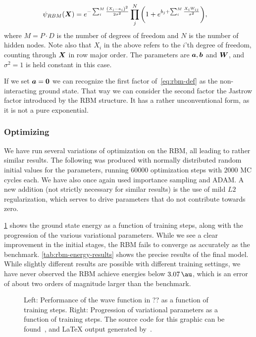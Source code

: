 \documentclass[Thesis.tex]{subfiles}
\begin{document}
\begin{align}
  \label{eq:rbm-def}
  \psi_{RBM}(\bm{X}) &=
        e^{-\sum_i^{M} \frac{\qty(X_i-a_i)^2}{2\sigma^2}}
        \prod_j^N \qty(1 + e^{b_j+\sum_i^M \frac{X_iW_{ij}}{\sigma^2}}),
\end{align}
where $M = P\cdot D$ is the number of degrees of freedom and $N$ is the number
of hidden nodes. Note also that $X_i$ in the above refers to the $i$'th degree
of freedom, counting through $\bm{X}$ in row major order. The parameters are
$\bm{a}, \bm{b}$ and $\bm{W}$, and $\sigma^2=1$ is held constant in this case.

If we set $\bm{a} = \bm{0}$ we can recognize the first factor of~\cref{eq:rbm-def}
as the non-interacting ground state. That way we can consider the second factor
the Jastrow factor introduced by the RBM structure. It has a rather
unconventional form, as it is not a pure exponential.


\subsubsection{Optimizing}

We have run several variations of optimization on the RBM, all leading to rather
similar results. The following was produced with normally distributed random
initial values for the parameters, running $\num{60000}$ optimization steps with
$\num{2000}$ MC cycles each. We have also once again used importance sampling
and ADAM. A new addition (not strictly necessary for similar results) is the use
of mild $L2$ regularization, which serves to drive parameters that do not
contribute towards zero.

\cref{fig:QD-rbm-training} shows the ground state energy as a function of
training steps, along with the progression of the various variational
parameters. While we see a clear improvement in the initial stages, the RBM
fails to converge as accurately as the benchmark. \cref{tab:rbm-energy-results}
shows the precise results of the final model. While slightly different results
are possible with different training settings, we have never observed the RBM
achieve energies below $\SI{3.07}{\au}$, which is an error of about two orders
of magnitude larger than the benchmark.



\begin{figure}[h]
   \centering
    \resizebox{\linewidth}{!}{%
        
    }
    \caption{\label{fig:QD-rbm-training}Left: Performance of the
      wave function in ?? as a function of
      training steps. Right: Progression of variational parameters as a function
      of training steps. The source code for this graphic can be found~\cite[TODO: Add
    path]{MS-thesis-repository}, and \LaTeX{} output generated
    by~\cite{nico_schlomer_2018_1173090}.}
\end{figure}
\end{document}

